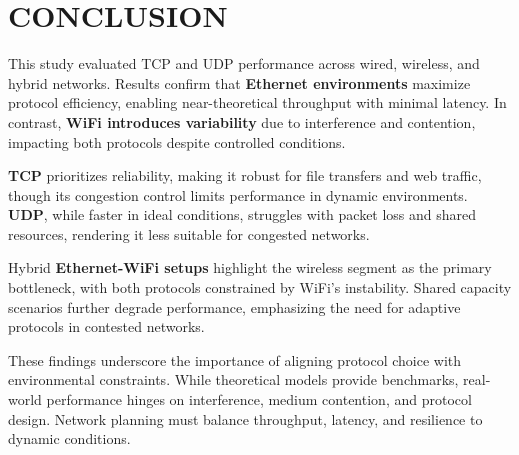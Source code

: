 \section{CONCLUSION} \label{sec:conclusion}

    This study evaluated TCP and UDP performance across wired, wireless, and hybrid networks. 
    Results confirm that \textbf{Ethernet environments} maximize protocol efficiency, enabling near-theoretical throughput with minimal latency. 
    In contrast, \textbf{WiFi introduces variability} due to interference and contention, impacting both protocols despite controlled conditions.

    \noindent
    \textbf{TCP} prioritizes reliability, making it robust for file transfers and web traffic, though its congestion control limits performance in dynamic environments. 
    \textbf{UDP}, while faster in ideal conditions, struggles with packet loss and shared resources, rendering it less suitable for congested networks.

    \noindent
    Hybrid \textbf{Ethernet-WiFi setups} highlight the wireless segment as the primary bottleneck, with both protocols constrained by WiFi’s instability. 
    Shared capacity scenarios further degrade performance, emphasizing the need for adaptive protocols in contested networks.

    \noindent
    These findings underscore the importance of aligning protocol choice with environmental constraints. 
    While theoretical models provide benchmarks, real-world performance hinges on interference, medium contention, and protocol design. 
    Network planning must balance throughput, latency, and resilience to dynamic conditions.
